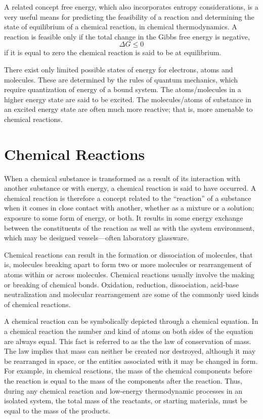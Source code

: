 A related concept free energy, which also incorporates entropy considerations, is a very useful means for predicting the feasibility of a reaction and determining the state of equilibrium of a chemical reaction, in chemical thermodynamics. A reaction is feasible only if the total change in the Gibbs free energy is negative, \[ \Delta G \leq 0 \] if it is equal to zero the chemical reaction is said to be at equilibrium.

There exist only limited possible states of energy for electrons, atoms and molecules. These are determined by the rules of quantum mechanics, which require quantization of energy of a bound system. The atoms/molecules in a higher energy state are said to be excited. The molecules/atoms of substance in an excited energy state are often much more reactive; that is, more amenable to chemical reactions.

\hypertarget{chemical-reactions}{%
\section{Chemical Reactions}\label{chemical-reactions}}

When a chemical substance is transformed as a result of its interaction with another substance or with energy, a chemical reaction is said to have occurred. A chemical reaction is therefore a concept related to the ``reaction'' of a substance when it comes in close contact with another, whether as a mixture or a solution; exposure to some form of energy, or both. It results in some energy exchange between the constituents of the reaction as well as with the system environment, which may be designed vessels---often laboratory glassware.

Chemical reactions can result in the formation or dissociation of molecules, that is, molecules breaking apart to form two or more molecules or rearrangement of atoms within or across molecules. Chemical reactions usually involve the making or breaking of chemical bonds. Oxidation, reduction, dissociation, acid-base neutralization and molecular rearrangement are some of the commonly used kinds of chemical reactions.

A chemical reaction can be symbolically depicted through a chemical equation. In a chemical reaction the number and kind of atoms on both sides of the equation are always equal. This fact is referred to as the the law of conservation of mass. The law implies that mass can neither be created nor destroyed, although it may be rearranged in space, or the entities associated with it may be changed in form. For example, in chemical reactions, the mass of the chemical components before the reaction is equal to the mass of the components after the reaction. Thus, during any chemical reaction and low-energy thermodynamic processes in an isolated system, the total mass of the reactants, or starting materials, must be equal to the mass of the products.

